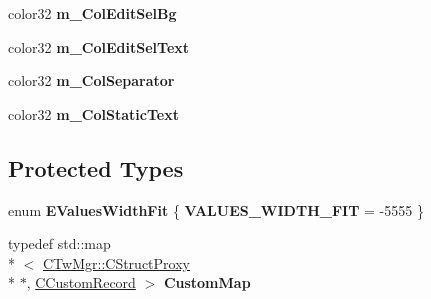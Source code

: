 \begin{DoxyCompactItemize}
\item 
\hypertarget{struct_c_tw_bar_acd9e69fca07cfbf4a896bff915173b34}{color32 {\bfseries m\+\_\+\+Col\+Edit\+Sel\+Bg}}\label{struct_c_tw_bar_acd9e69fca07cfbf4a896bff915173b34}

\item 
\hypertarget{struct_c_tw_bar_a9d85bc00e6f444029838beb45f7ab000}{color32 {\bfseries m\+\_\+\+Col\+Edit\+Sel\+Text}}\label{struct_c_tw_bar_a9d85bc00e6f444029838beb45f7ab000}

\item 
\hypertarget{struct_c_tw_bar_aab9690405848c12d28f6094f0e0de8a7}{color32 {\bfseries m\+\_\+\+Col\+Separator}}\label{struct_c_tw_bar_aab9690405848c12d28f6094f0e0de8a7}

\item 
\hypertarget{struct_c_tw_bar_a5453d4a096c13999345409a52b7e136d}{color32 {\bfseries m\+\_\+\+Col\+Static\+Text}}\label{struct_c_tw_bar_a5453d4a096c13999345409a52b7e136d}

\end{DoxyCompactItemize}
\subsection*{Protected Types}
\begin{DoxyCompactItemize}
\item 
\hypertarget{struct_c_tw_bar_a8d8a20a567a01638b68a03fd4abdba20}{enum {\bfseries E\+Values\+Width\+Fit} \{ {\bfseries V\+A\+L\+U\+E\+S\+\_\+\+W\+I\+D\+T\+H\+\_\+\+F\+I\+T} = -\/5555
 \}}\label{struct_c_tw_bar_a8d8a20a567a01638b68a03fd4abdba20}

\item 
\hypertarget{struct_c_tw_bar_a414ee9026919e4ae1d35c04c03a6e5d7}{typedef std\+::map\\*
$<$ \hyperlink{struct_c_tw_mgr_1_1_c_struct_proxy}{C\+Tw\+Mgr\+::\+C\+Struct\+Proxy} \\*
$\ast$, \hyperlink{struct_c_tw_bar_1_1_c_custom_record}{C\+Custom\+Record} $>$ {\bfseries Custom\+Map}}\label{struct_c_tw_bar_a414ee9026919e4ae1d35c04c03a6e5d7}

\end{DoxyCompactItemize}
